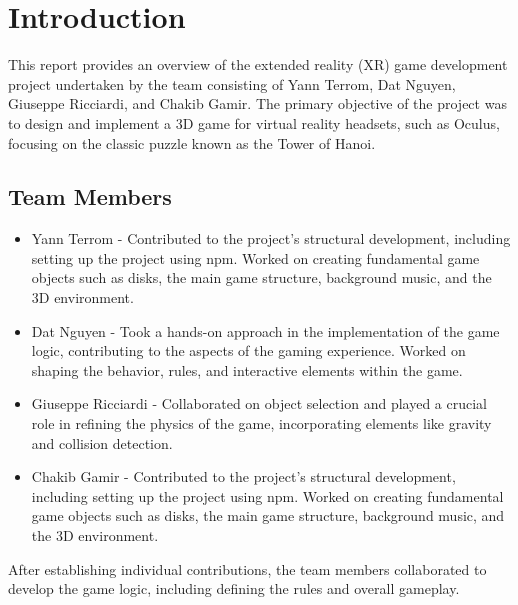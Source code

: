 \documentclass{article}
\begin{document}
\newpage


\tableofcontents

\newpage


\listoffigures

\newpage

\lstlistoflistings


\newpage



\section{Introduction}
This report provides an overview of the extended reality (XR) game development project undertaken by the team consisting of Yann Terrom, Dat Nguyen, Giuseppe Ricciardi, and Chakib Gamir. The primary objective of the project was to design and implement a 3D game for virtual reality headsets, such as Oculus, focusing on the classic puzzle known as the Tower of Hanoi.

\subsection{Team Members}
\begin{itemize}
    \item Yann Terrom - Contributed to the project's structural development, including setting up the project using npm. Worked on creating fundamental game objects such as disks, the main game structure, background music, and the 3D environment.

    \item Dat Nguyen - Took a hands-on approach in the implementation of the game logic, contributing to the aspects of the gaming experience. Worked on shaping the behavior, rules, and interactive elements within the game.
    \item Giuseppe Ricciardi - Collaborated on object selection and played a crucial role in refining the physics of the game, incorporating elements like gravity and collision detection.

    \item Chakib Gamir - Contributed to the project's structural development, including setting up the project using npm. Worked on creating fundamental game objects such as disks, the main game structure, background music, and the 3D environment.

\end{itemize}

After establishing individual contributions, the team members collaborated to develop the game logic, including defining the rules and overall gameplay.
\end{document}
